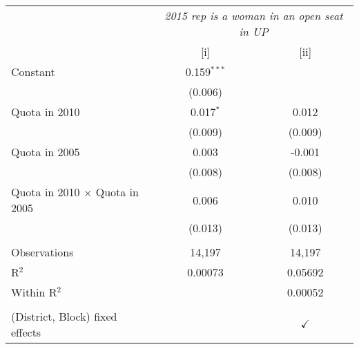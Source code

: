 
\begingroup
\centering
\begin{tabular}{lcc}
   \toprule
    & \multicolumn{2}{c}{\textit{2015 rep is a woman in an open seat in UP}}\\
                                         & [i]           & [ii]\\  
   \midrule 
   Constant                              & 0.159$^{***}$ &   \\   
                                         & (0.006)       &   \\   
   Quota in 2010                         & 0.017$^{*}$   & 0.012\\   
                                         & (0.009)       & (0.009)\\   
   Quota in 2005                         & 0.003         & -0.001\\   
                                         & (0.008)       & (0.008)\\   
   Quota in 2010 $\times$ Quota in 2005  & 0.006         & 0.010\\   
                                         & (0.013)       & (0.013)\\   
    \\
   Observations                          & 14,197        & 14,197\\  
   R$^2$                                 & 0.00073       & 0.05692\\  
   Within R$^2$                          &               & 0.00052\\  
    \\
   (District, Block) fixed effects       &               & $\checkmark$\\   
   \bottomrule
\end{tabular}
\par\endgroup


